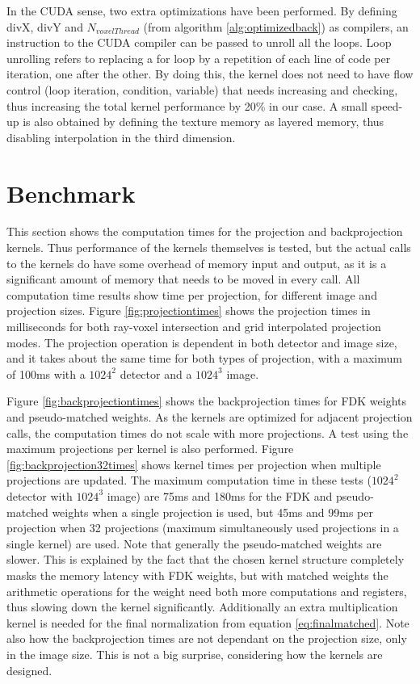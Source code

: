 In the CUDA sense, two extra optimizations have been performed. By defining divX, divY and $N_{voxelThread}$ (from algorithm \ref{alg:optimizedback}) as compilers, an instruction to the CUDA compiler can be passed to unroll all the loops. Loop unrolling refers to replacing a for loop by a repetition of each line of code per iteration, one after the other. By doing this, the kernel does not need to have flow control (loop iteration, condition, variable) that needs increasing and checking, thus increasing the total kernel performance by 20\% in our case. A small speed-up is also obtained by defining the texture memory as layered memory, thus disabling interpolation in the third dimension.


\FloatBarrier
\section{Benchmark}\label{sec:speed}

This section shows the computation times for the projection and backprojection kernels. Thus performance of the kernels themselves is tested, but the actual calls to the kernels do have some overhead of memory input and output, as it is a significant amount of memory that needs to be moved in every call. All computation time results show time per projection, for different image and projection sizes. Figure \ref{fig:projectiontimes} shows the projection times in milliseconds for both ray-voxel intersection and grid interpolated projection modes. The projection operation is dependent in both detector and image size, and it takes about the same time for both types of projection, with a maximum of 100ms with a $1024^2$ detector and a $1024^3$ image.


 Figure \ref{fig:backprojectiontimes} shows the backprojection times for FDK weights and pseudo-matched weights. As the kernels are optimized for adjacent projection calls, the computation times do not scale with more projections. A test using the maximum projections per kernel is also performed. Figure \ref{fig:backprojection32times} shows kernel times per projection when multiple projections are updated. The maximum computation time in these tests ($1024^2$ detector with $1024^3$ image) are 75ms and 180ms for the FDK and pseudo-matched weights when a single projection is used, but 45ms and 99ms per projection when 32 projections (maximum simultaneously used projections in a single kernel) are used. Note that generally the pseudo-matched weights are slower. This is explained by the fact that the chosen kernel structure completely masks the memory latency with FDK weights, but with matched weights the arithmetic operations for the weight need both more computations and registers, thus slowing down the kernel significantly. Additionally an extra multiplication kernel is needed for the final normalization from equation \ref{eq:finalmatched}. Note also how the backprojection times are not dependant on the projection size, only in the image size. This is not a big surprise, considering how the kernels are designed.
 

